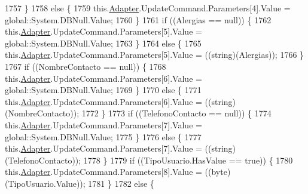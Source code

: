 \begin{DoxyCode}
1757             \}
1758             \textcolor{keywordflow}{else} \{
1759                 this.\hyperlink{class_proyecto___integrador__3_1_1ds_usuarios_table_adapters_1_1_usuarios_table_adapter_a46252bad9dadbf20130beca25d50b5bc}{Adapter}.UpdateCommand.Parameters[4].Value = global::System.DBNull.Value;
1760             \}
1761             \textcolor{keywordflow}{if} ((Alergias == null)) \{
1762                 this.\hyperlink{class_proyecto___integrador__3_1_1ds_usuarios_table_adapters_1_1_usuarios_table_adapter_a46252bad9dadbf20130beca25d50b5bc}{Adapter}.UpdateCommand.Parameters[5].Value = global::System.DBNull.Value;
1763             \}
1764             \textcolor{keywordflow}{else} \{
1765                 this.\hyperlink{class_proyecto___integrador__3_1_1ds_usuarios_table_adapters_1_1_usuarios_table_adapter_a46252bad9dadbf20130beca25d50b5bc}{Adapter}.UpdateCommand.Parameters[5].Value = ((string)(Alergias));
1766             \}
1767             \textcolor{keywordflow}{if} ((NombreContacto == null)) \{
1768                 this.\hyperlink{class_proyecto___integrador__3_1_1ds_usuarios_table_adapters_1_1_usuarios_table_adapter_a46252bad9dadbf20130beca25d50b5bc}{Adapter}.UpdateCommand.Parameters[6].Value = global::System.DBNull.Value;
1769             \}
1770             \textcolor{keywordflow}{else} \{
1771                 this.\hyperlink{class_proyecto___integrador__3_1_1ds_usuarios_table_adapters_1_1_usuarios_table_adapter_a46252bad9dadbf20130beca25d50b5bc}{Adapter}.UpdateCommand.Parameters[6].Value = ((string)(NombreContacto));
1772             \}
1773             \textcolor{keywordflow}{if} ((TelefonoContacto == null)) \{
1774                 this.\hyperlink{class_proyecto___integrador__3_1_1ds_usuarios_table_adapters_1_1_usuarios_table_adapter_a46252bad9dadbf20130beca25d50b5bc}{Adapter}.UpdateCommand.Parameters[7].Value = global::System.DBNull.Value;
1775             \}
1776             \textcolor{keywordflow}{else} \{
1777                 this.\hyperlink{class_proyecto___integrador__3_1_1ds_usuarios_table_adapters_1_1_usuarios_table_adapter_a46252bad9dadbf20130beca25d50b5bc}{Adapter}.UpdateCommand.Parameters[7].Value = ((string)(TelefonoContacto));
1778             \}
1779             \textcolor{keywordflow}{if} ((TipoUsuario.HasValue == \textcolor{keyword}{true})) \{
1780                 this.\hyperlink{class_proyecto___integrador__3_1_1ds_usuarios_table_adapters_1_1_usuarios_table_adapter_a46252bad9dadbf20130beca25d50b5bc}{Adapter}.UpdateCommand.Parameters[8].Value = ((byte)(TipoUsuario.Value));
1781             \}
1782             \textcolor{keywordflow}{else} \{

\end{DoxyCode}
